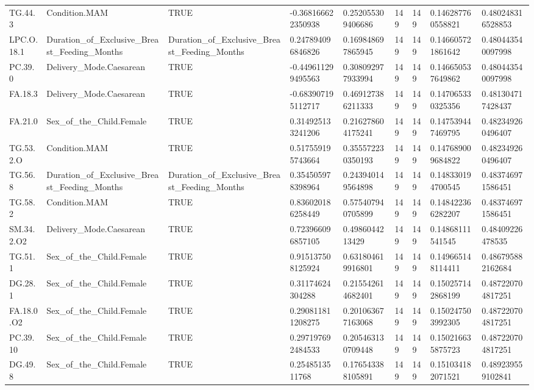 \begin{longtable}{lllllllll}
TG.44.3 & Condition.MAM & TRUE & -0.368166622350938 & 0.252055309406686 & 149 & 149 & 0.146287760558821 & 0.480248316528853 \\
LPC.O.18.1 & Duration\_of\_Exclusive\_Breast\_Feeding\_Months & Duration\_of\_Exclusive\_Breast\_Feeding\_Months & 0.247894096846826 & 0.169848697865945 & 149 & 149 & 0.146605721861642 & 0.480443540097998 \\
PC.39.0 & Delivery\_Mode.Caesarean & TRUE & -0.449611299495563 & 0.308092977933994 & 149 & 149 & 0.146650537649862 & 0.480443540097998 \\
FA.18.3 & Delivery\_Mode.Caesarean & TRUE & -0.683907195112717 & 0.469127386211333 & 149 & 149 & 0.147065330325356 & 0.481304717428437 \\
FA.21.0 & Sex\_of\_the\_Child.Female & TRUE & 0.314925133241206 & 0.216278604175241 & 149 & 149 & 0.147539447469795 & 0.482349260496407 \\
TG.53.2.O & Condition.MAM & TRUE & 0.517559195743664 & 0.355572230350193 & 149 & 149 & 0.147689009684822 & 0.482349260496407 \\
TG.56.8 & Duration\_of\_Exclusive\_Breast\_Feeding\_Months & Duration\_of\_Exclusive\_Breast\_Feeding\_Months & 0.354505978398964 & 0.243940149564898 & 149 & 149 & 0.148330194700545 & 0.483746971586451 \\
TG.58.2 & Condition.MAM & TRUE & 0.836020186258449 & 0.575407940705899 & 149 & 149 & 0.148422366282207 & 0.483746971586451 \\
SM.34.2.O2 & Delivery\_Mode.Caesarean & TRUE & 0.723966096857105 & 0.4986044213429 & 149 & 149 & 0.14868111541545 & 0.48409226478535 \\
TG.51.1 & Sex\_of\_the\_Child.Female & TRUE & 0.915137508125924 & 0.631804619916801 & 149 & 149 & 0.149665148114411 & 0.486795882162684 \\
DG.28.1 & Sex\_of\_the\_Child.Female & TRUE & 0.31174624304288 & 0.215542614682401 & 149 & 149 & 0.150257142868199 & 0.487220704817251 \\
FA.18.0.O2 & Sex\_of\_the\_Child.Female & TRUE & 0.290811811208275 & 0.201063677163068 & 149 & 149 & 0.150247503992305 & 0.487220704817251 \\
PC.39.10 & Sex\_of\_the\_Child.Female & TRUE & 0.297197692484533 & 0.205463130709448 & 149 & 149 & 0.150216635875723 & 0.487220704817251 \\
DG.49.8 & Sex\_of\_the\_Child.Female & TRUE & 0.2548513511768 & 0.176543388105891 & 149 & 149 & 0.151034182071521 & 0.489239559102841 \\

\end{longtable}

